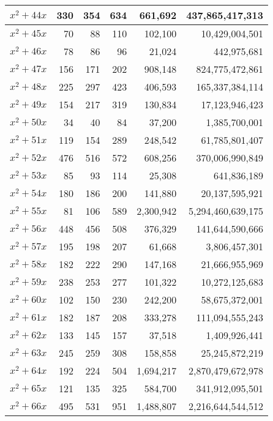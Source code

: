 \documentclass[a4paper]{amsproc}
\theoremstyle{plain}
\begin{document}
\begin{longtable}{ | l | r | r | r | r | r | }
$x^2 + 44x$ & 330 & 354 & 634 & 661{,}692 & 437{,}865{,}417{,}313 \\ \hline
$x^2 + 45x$ & 70 & 88 & 110 & 102{,}100 & 10{,}429{,}004{,}501 \\ \hline
$x^2 + 46x$ & 78 & 86 & 96 & 21{,}024 & 442{,}975{,}681 \\ \hline
$x^2 + 47x$ & 156 & 171 & 202 & 908{,}148 & 824{,}775{,}472{,}861 \\ \hline
$x^2 + 48x$ & 225 & 297 & 423 & 406{,}593 & 165{,}337{,}384{,}114 \\ \hline
$x^2 + 49x$ & 154 & 217 & 319 & 130{,}834 & 17{,}123{,}946{,}423 \\ \hline
$x^2 + 50x$ & 34 & 40 & 84 & 37{,}200 & 1{,}385{,}700{,}001 \\ \hline
$x^2 + 51x$ & 119 & 154 & 289 & 248{,}542 & 61{,}785{,}801{,}407 \\ \hline
$x^2 + 52x$ & 476 & 516 & 572 & 608{,}256 & 370{,}006{,}990{,}849 \\ \hline
$x^2 + 53x$ & 85 & 93 & 114 & 25{,}308 & 641{,}836{,}189 \\ \hline
$x^2 + 54x$ & 180 & 186 & 200 & 141{,}880 & 20{,}137{,}595{,}921 \\ \hline
$x^2 + 55x$ & 81 & 106 & 589 & 2{,}300{,}942 & 5{,}294{,}460{,}639{,}175 \\ \hline
$x^2 + 56x$ & 448 & 456 & 508 & 376{,}329 & 141{,}644{,}590{,}666 \\ \hline
$x^2 + 57x$ & 195 & 198 & 207 & 61{,}668 & 3{,}806{,}457{,}301 \\ \hline
$x^2 + 58x$ & 182 & 222 & 290 & 147{,}168 & 21{,}666{,}955{,}969 \\ \hline
$x^2 + 59x$ & 238 & 253 & 277 & 101{,}322 & 10{,}272{,}125{,}683 \\ \hline
$x^2 + 60x$ & 102 & 150 & 230 & 242{,}200 & 58{,}675{,}372{,}001 \\ \hline
$x^2 + 61x$ & 182 & 187 & 208 & 333{,}278 & 111{,}094{,}555{,}243 \\ \hline
$x^2 + 62x$ & 133 & 145 & 157 & 37{,}518 & 1{,}409{,}926{,}441 \\ \hline
$x^2 + 63x$ & 245 & 259 & 308 & 158{,}858 & 25{,}245{,}872{,}219 \\ \hline
$x^2 + 64x$ & 192 & 224 & 504 & 1{,}694{,}217 & 2{,}870{,}479{,}672{,}978 \\ \hline
$x^2 + 65x$ & 121 & 135 & 325 & 584{,}700 & 341{,}912{,}095{,}501 \\ \hline
$x^2 + 66x$ & 495 & 531 & 951 & 1{,}488{,}807 & 2{,}216{,}644{,}544{,}512 \\ \hline

\end{longtable}
\end{document}
